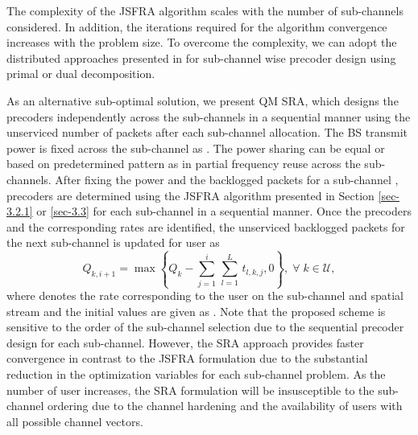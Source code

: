 
The complexity of the \ac{JSFRA} algorithm scales with the number of sub-channels considered. In addition, the iterations required for the algorithm convergence increases with the problem size. To overcome the complexity, we can adopt the distributed approaches presented in \cite{palomar2006tutorial,boyd2011distributed} for sub-channel wise precoder design using primal or dual decomposition. 

As an alternative sub-optimal solution, we present \acl{QM} \ac{SRA}, which designs the precoders independently across the sub-channels in a sequential manner using the unserviced  number of packets after each sub-channel allocation. The \ac{BS} transmit power is fixed across the sub-channel  as . The power sharing can be equal or based on predetermined pattern as in partial frequency reuse across the sub-channels. After fixing the power and the backlogged packets for a sub-channel , precoders are determined using the \ac{JSFRA} algorithm presented in Section \ref{sec-3.2.1} or \ref{sec-3.3} for each sub-channel in a sequential manner. Once the precoders and the corresponding rates are identified, the unserviced backlogged packets for the next sub-channel  is updated for user  as
\begin{equation}	\label{eqn-weight}
	Q_{k,i+1} = \max{\left \lbrace Q_k - \sum_{j = 1}^{i} \, \sum_{l = 1}^{L} \, t_{l,k,j} ,0 \right \rbrace }, \; \forall \; k \in \mathcal{U},
\end{equation}
where  denotes the rate corresponding to the user  on the  sub-channel and  spatial stream and the initial values are given as . Note that the proposed scheme is sensitive to the order of the sub-channel selection due to the sequential precoder design for each sub-channel. However, the \ac{SRA} approach provides faster convergence in contrast to the \ac{JSFRA} formulation due to the substantial reduction in the optimization variables for each sub-channel problem. 
As the number of user increases, the \ac{SRA} formulation will be insusceptible to the sub-channel ordering due to the channel hardening and the availability of users with all possible channel vectors.
